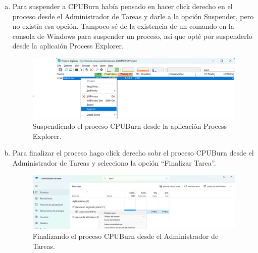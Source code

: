 \documentclass[12pt]{article}
\begin{document}
\begin{enumerate}[1.]
\begin{enumerate}[a.]
      \item Para suspender a CPUBurn había pensado en hacer click derecho en el proceso desde el Administrador de Tareas y darle a la opción Suspender, pero no existía esa opción. Tampoco sé de la existencia de un comando en la consola de Windows para suspender un proceso, así que opté por suspenderlo desde la aplicaión Process Explorer.
	\begin{figure}[H]
	  \centering
	  \includegraphics[width=\linewidth]{../imagenes/cpuburn-suspend.png}
	  \caption{Suspendiendo el proceso CPUBurn desde la aplicación Process Explorer.}
	  \label{fig:cpuburn-suspend}
	\end{figure}

      \item Para finalizar el proceso hago click derecho sobr el proceso CPUBurn desde el Administrador de Tareas y selecciono la opción ``Finalizar Tarea''.
	\begin{figure}[H]
	  \centering
	  \includegraphics[width=\linewidth]{../imagenes/cpuburn-finalizar.png}
	  \caption{Finalizando el proceso CPUBurn desde el Administrador de Tareas.}
	  \label{cpuburn-finalizar}
	\end{figure}
    \end{enumerate}


\end{enumerate}
\end{document}
